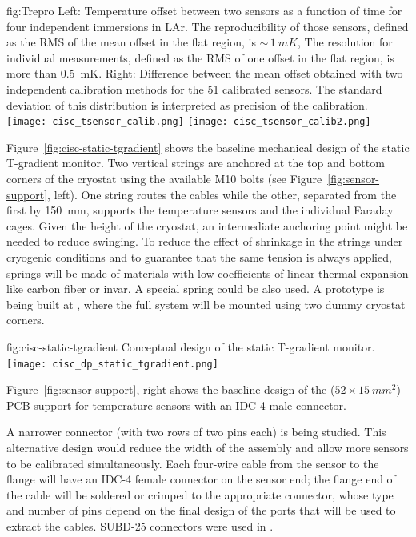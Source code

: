\begin{dunefigure}{fig:Trepro}{
 Left:   Temperature offset between two sensors as a function of time for four independent immersions in LAr. The reproducibility of those sensors, defined as the RMS of the mean offset in the flat region, is $\sim\,\SI{1}{mK}$,
    The resolution for individual measurements, defined as the RMS of one offset in the flat region, is more than \SI{0.5}{mK}. Right: Difference between the mean offset obtained with two independent calibration methods for the 51 calibrated sensors. The standard deviation of this distribution is interpreted as precision of the calibration.}
  \texttt{[image: cisc\_tsensor\_calib.png]}%
  \texttt{[image: cisc\_tsensor\_calib2.png]}%
\end{dunefigure}



Figure~\ref{fig:cisc-static-tgradient} shows the baseline mechanical design of
the static T-gradient monitor. Two vertical strings are anchored at the top and bottom corners of the cryostat
using the available M10 bolts (see Figure~\ref{fig:sensor-support}, left). One string routes the cables while the other,
separated from the first by \SI{150}{mm},  supports the temperature sensors and the individual Faraday cages. 
Given the height of the cryostat, an intermediate anchoring point might be needed to reduce swinging. To reduce the effect of shrinkage in the strings under cryogenic conditions and to guarantee that the same tension is always applied, springs will be made of materials with low coefficients of linear thermal expansion like carbon fiber or invar. A special spring could be also used. A prototype is being built at , where the full system will be mounted using two dummy cryostat corners.  
\begin{dunefigure}
{fig:cisc-static-tgradient}
  {Conceptual design of the static T-gradient monitor.}
  \texttt{[image: cisc\_dp\_static\_tgradient.png]}
\end{dunefigure}


Figure~\ref{fig:sensor-support}, right shows the baseline design of the ($52\times \SI{15}{mm^2}$) 
PCB support for temperature sensors with an IDC-4 male connector. %

A narrower connector (with two rows of two pins each) is being studied. This alternative design would reduce the width of the  assembly and allow more sensors to be calibrated simultaneously. Each four-wire cable from the sensor to the flange will have an IDC-4 female connector on the sensor end; the flange end of the cable will be soldered or crimped to the appropriate connector, whose type and number of pins  depend on the final design of the  ports that will be used to extract the cables. SUBD-25 connectors were used in .


